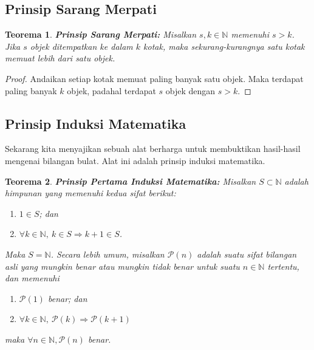 \documentclass[12pt,letterpaper]{amsbook}
\newtheorem{theorem}{Teorema}[section]
\theoremstyle{definition}
\theoremstyle{remark}
\numberwithin{figure}{section}
\numberwithin{exercise}{section}
\numberwithin{section}{chapter}
\numberwithin{equation}{section}
\numberwithin{table}{section}
\newcommand{\NN}{{\mathbb N}}
\newcommand{\Pp}{{\mathcal P}}
\newenvironment{discussion}{}{}
\begin{document}
\subsection{\textbf{Prinsip Sarang Merpati}}

\begin{theorem}
\label{thm:pigeonhole}
\textbf{Prinsip Sarang Merpati:}
Misalkan $s,k\in\NN$ memenuhi $s>k$. Jika $s$ objek ditempatkan ke dalam $k$
kotak, maka sekurang-kurangnya satu kotak memuat lebih dari satu objek.
\end{theorem}

\begin{proof}
Andaikan setiap kotak memuat paling banyak satu objek. Maka terdapat paling
banyak $k$ objek, padahal terdapat $s$ objek dengan $s>k$.
\end{proof}

\subsection{\textbf{Prinsip Induksi Matematika}}

\begin{discussion}
Sekarang kita menyajikan sebuah alat berharga untuk membuktikan hasil-hasil
mengenai bilangan bulat. Alat ini adalah prinsip induksi matematika.
\end{discussion}

\begin{theorem}
\textbf{Prinsip Pertama Induksi Matematika:}
Misalkan $S\subset\NN$ adalah himpunan yang memenuhi kedua sifat berikut:
\begin{enumerate}
\item $1\in S$; dan
\item $\forall k\in\NN,\ k\in S\Rightarrow k+1\in S$.
\end{enumerate}
Maka $S=\NN$.\newline
Secara lebih umum, misalkan $\Pp(n)$ adalah suatu sifat bilangan asli yang
mungkin benar atau mungkin tidak benar untuk suatu $n\in\NN$ tertentu, dan
memenuhi
\begin{enumerate}
\item $\Pp(1)$ benar; dan
\item $\forall k\in\NN,\ \Pp(k)\Rightarrow\Pp(k+1)$
\end{enumerate}
maka $\forall n\in\NN, \Pp(n)$ benar.
\end{theorem}
\end{document}
